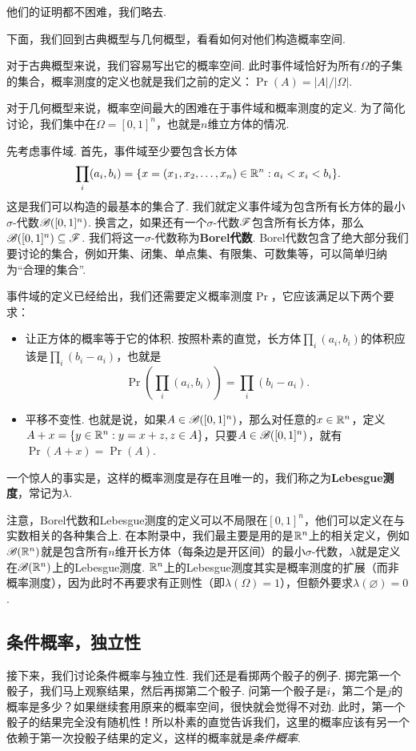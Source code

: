 他们的证明都不困难，我们略去. 

下面，我们回到古典概型与几何概型，看看如何对他们构造概率空间.  

对于古典概型来说，我们容易写出它的概率空间. 此时事件域恰好为所有$\Omega$的子集的集合，概率测度的定义也就是我们之前的定义：$\Pr(A)=|A|/|\Omega|$. 

对于几何概型来说，概率空间最大的困难在于事件域和概率测度的定义. 为了简化讨论，我们集中在$\Omega=[0,1]^n$，也就是$n$维立方体的情况. 

先考虑事件域. 首先，事件域至少要包含长方体
\[\prod_i(a_i,b_i)=\{x=(x_1,x_2,\ldots,x_n)\in\mathbb{R}^n:a_i<x_i<b_i\}.\]
这是我们可以构造的最基本的集合了. 我们就定义事件域为包含所有长方体的最小$\sigma$-代数$\mathscr{B}([0,1]^n)$. 换言之，如果还有一个$\sigma$-代数$\mathscr{F}$包含所有长方体，那么$\mathscr{B}([0,1]^n)\subseteq\mathscr{F}$. 我们将这一$\sigma$-代数称为\textbf{Borel代数}. Borel代数包含了绝大部分我们要讨论的集合，例如开集、闭集、单点集、有限集、可数集等，可以简单归纳为“合理的集合”. 

事件域的定义已经给出，我们还需要定义概率测度$\Pr$，它应该满足以下两个要求：
\begin{itemize}
    \item 让正方体的概率等于它的体积. 按照朴素的直觉，长方体$\prod_i(a_i,b_i)$的体积应该是$\prod_i(b_i-a_i)$，也就是
    \[
        \Pr\left(\prod_i(a_i,b_i)\right) = \prod_i(b_i-a_i).
    \]
    \item 平移不变性. 也就是说，如果$A\in\mathscr{B}([0,1]^n)$，那么对任意的$x\in\mathbb{R}^n$，定义$A+x=\{y\in\mathbb{R}^n:y=x+z,z\in A\}$，只要$A\in\mathscr{B}([0,1]^n)$，就有$\Pr(A+x)=\Pr(A)$.
\end{itemize}
一个惊人的事实是，这样的概率测度是存在且唯一的，我们称之为\textbf{Lebesgue测度}，常记为$\lambda$.

注意，Borel代数和Lebesgue测度的定义可以不局限在$[0,1]^n$，他们可以定义在与实数相关的各种集合上. 在本附录中，我们最主要是用的是$\mathbb{R}^n$上的相关定义，例如$\mathscr{B}(\mathbb{R}^n)$就是包含所有$n$维开长方体（每条边是开区间）的最小$\sigma$-代数，$\lambda$就是定义在$\mathscr{B}(\mathbb{R}^n)$上的Lebesgue测度. $\mathbb{R}^n$上的Lebesgue测度其实是概率测度的扩展（而非概率测度），因为此时不再要求有正则性（即$\lambda(\Omega)=1$），但额外要求$\lambda(\varnothing)=0$.

\subsection{条件概率，独立性}
接下来，我们讨论条件概率与独立性. 我们还是看掷两个骰子的例子. 掷完第一个骰子，我们马上观察结果，然后再掷第二个骰子. 问第一个骰子是$i$，第二个是$j$的概率是多少？如果继续套用原来的概率空间，很快就会觉得不对劲. 此时，第一个骰子的结果完全没有随机性！所以朴素的直觉告诉我们，这里的概率应该有另一个依赖于第一次投骰子结果的定义，这样的概率就是\emph{条件概率}. 

